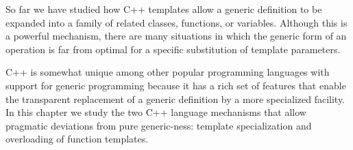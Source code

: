 So far we have studied how C++ templates allow a generic definition to be expanded into a family of related classes, functions, or variables. Although this is a powerful mechanism, there are many situations in which the generic form of an operation is far from optimal for a specific substitution of template parameters.

C++ is somewhat unique among other popular programming languages with support for generic programming because it has a rich set of features that enable the transparent replacement of a generic definition by a more specialized facility. In this chapter we study the two C++ language mechanisms that allow pragmatic deviations from pure generic-ness: template specialization and overloading of function templates.